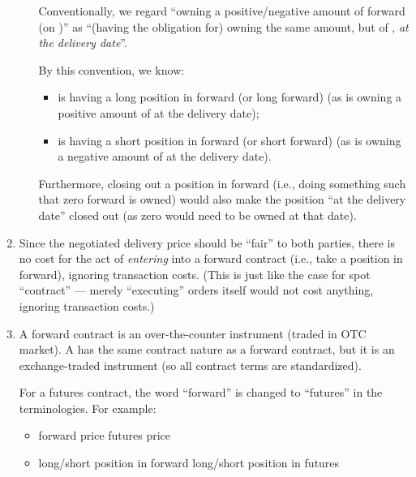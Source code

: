 \begin{enumerate}
\begin{itemize}
\begin{center}
\end{center}
Conventionally, we regard ``owning a positive/negative amount of forward
 (on )'' as ``(having the obligation for) owning
the same amount, but of , \emph{at the delivery date}''.

By this convention, we know:
\begin{itemize}
\item {\color{violet}} is having a long position in forward (or
long forward) (as {\color{violet}} is owning a positive amount
of  at the delivery date);
\item {\color{orange}} is having a short position in forward
(or short forward) (as {\color{orange}} is owning a negative
amount of  at the delivery date).
\end{itemize}
Furthermore, closing out a position in forward (i.e., doing something such
that zero forward is owned) would also make the position ``at the delivery
date'' closed out (as zero  would need to be
owned at that date).
\end{itemize}

\item Since the negotiated delivery price should be ``fair'' to both parties,
there is no cost for the act of \emph{entering} into a forward contract (i.e.,
take a position in forward), ignoring transaction costs. (This is just like the
case for spot ``contract'' --- merely ``executing'' orders itself would not
cost anything, ignoring transaction costs.)

\item A forward contract is an over-the-counter instrument (traded in OTC
market). A  has the same contract nature as a forward
contract, but it is an exchange-traded instrument (so all contract terms are
standardized).

\begin{note}
For a futures contract, the word ``forward'' is changed to ``futures'' in the
terminologies. For example:
\begin{itemize}
\item forward price  futures price
\item long/short position in forward  long/short position
in futures
\end{itemize}
\end{note}
\end{enumerate}
